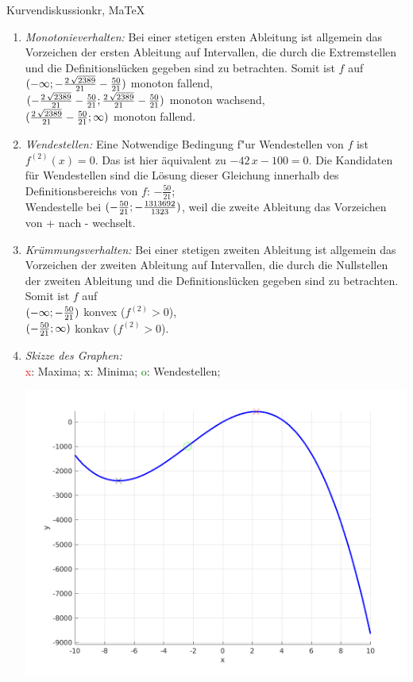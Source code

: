 \begin{MAufgabe}{Kurvendiskussion}{kr, MaTeX}
\begin{enumerate}
 \item \emph{Monotonieverhalten:} 
 Bei einer stetigen ersten Ableitung ist allgemein das Vorzeichen der ersten Ableitung auf Intervallen, die durch die Extremstellen und die Definitionsl\"ucken gegeben sind zu betrachten. Somit ist $f$ auf \\ 
 $(-\infty; - \frac{2\, \sqrt{2389}}{21} - \frac{50}{21})$ monoton fallend, \\ 
 $( - \frac{2\, \sqrt{2389}}{21} - \frac{50}{21};\frac{2\, \sqrt{2389}}{21} - \frac{50}{21})$ monoton  wachsend, \\ 
 $(\frac{2\, \sqrt{2389}}{21} - \frac{50}{21}; \infty)$ monoton fallend. \\ 
 \item \emph{Wendestellen:} 
 Eine Notwendige Bedingung f"ur Wendestellen von $f$ ist $f^{(2)}(x)=0$. 
 Das ist hier \"aquivalent zu $ - 42\, x - 100=0$. 
 Die Kandidaten f\"ur Wendestellen sind die L\"osung dieser Gleichung innerhalb des Definitionsbereichs von $f$: $- \frac{50}{21}$; \\ 
 Wendestelle bei $(- \frac{50}{21};- \frac{1313692}{1323})$, weil die zweite Ableitung das Vorzeichen von + nach - wechselt. \\ 
 \item \emph{Kr\"ummungsverhalten:} 
 Bei einer stetigen zweiten Ableitung ist allgemein das Vorzeichen der zweiten Ableitung auf Intervallen, die durch die Nullstellen der zweiten Ableitung und die Definitionsl\"ucken gegeben sind zu betrachten. 
 Somit ist $f$ auf \\ 
 $(-\infty ;- \frac{50}{21})$  konvex ($f^{(2)}>0$), \\ 
 $(- \frac{50}{21}; \infty)$  konkav ($f^{(2)}>0$). \\ 
 \item \emph{Skizze des Graphen:} \\ 
 {\textcolor{red} x}: Maxima; {\textcolor{black} x}: Minima; {\textcolor{green} o}: Wendestellen; 
  \begin{center}
  \includegraphics[width=0.8\linewidth]{Abb_zur_Ag_autogenerated_fractions_46.png} \end{center}
  
 \end{enumerate}
 \else\relax\fi
  \end{MAufgabe}